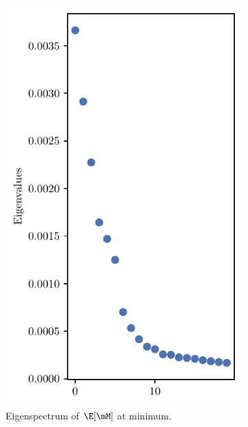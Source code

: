 \begin{figure}[H]
    \centering
    \begin{subfigure}[b]{0.2\textwidth}
        \centering
        \captionsetup{justification=centering}
        \includegraphics[width=\textwidth]{Appendix_Figures/TSNE_M/new/spec_E-1_gamma_ccp_cluster_pred_fc1.pdf}
        \caption{Eigenspectrum of $\E[\mM]$ at minimum.}
        \label{fig:app_tsne_h_init}
    \end{subfigure}%
    \begin{subfigure}[b]{0.4\textwidth}
        \centering
        \captionsetup{justification=centering}

\end{subfigure}
\end{figure}
